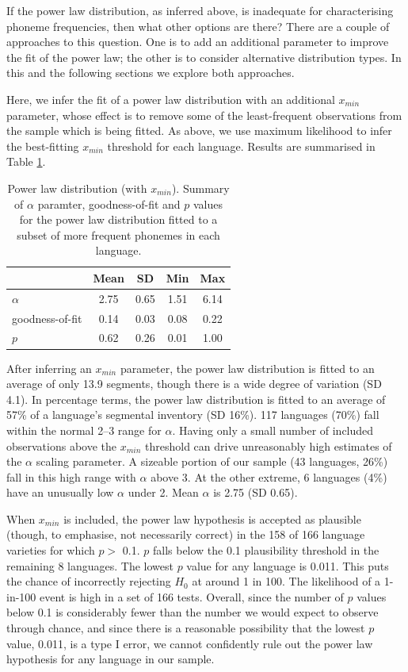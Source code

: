 If the power law distribution, as inferred above, is inadequate for characterising phoneme frequencies, then what other options are there? There are a couple of approaches to this question. One is to add an additional parameter to improve the fit of the power law; the other is to consider alternative distribution types. In this and the following sections we explore both approaches.

Here, we infer the fit of a power law distribution with an additional \(x_{min}\) parameter, whose effect is to remove some of the least-frequent observations from the sample which is being fitted. As above, we use maximum likelihood to infer the best-fitting \(x_{min}\) threshold for each language. Results are summarised in Table \ref{tab:pl-xmin-summary}.

\begin{table}

\caption{\label{tab:pl-xmin-summary}Power law distribution (with $x_{min}$). Summary of $\alpha$ paramter, goodness-of-fit and $p$ values for the power law distribution fitted to a subset of more frequent phonemes in each language.}
\centering
\begin{tabular}[t]{lcccc}
\toprule
\textbf{ } & \textbf{Mean} & \textbf{SD} & \textbf{Min} & \textbf{Max}\\
\midrule
$\alpha$ & 2.75 & 0.65 & 1.51 & 6.14\\
goodness-of-fit & 0.14 & 0.03 & 0.08 & 0.22\\
$p$ & 0.62 & 0.26 & 0.01 & 1.00\\
\bottomrule
\end{tabular}
\end{table}

After inferring an \(x_{min}\) parameter, the power law distribution is fitted to an average of only 13.9 segments, though there is a wide degree of variation (SD 4.1). In percentage terms, the power law distribution is fitted to an average of 57\% of a language's segmental inventory (SD 16\%). 117 languages (70\%) fall within the normal 2--3 range for \(\alpha\). Having only a small number of included observations above the \(x_{min}\) threshold can drive unreasonably high estimates of the \(\alpha\) scaling parameter. A sizeable portion of our sample (43 languages, 26\%) fall in this high range with \(\alpha\) above 3. At the other extreme, 6 languages (4\%) have an unusually low \(\alpha\) under 2. Mean \(\alpha\) is 2.75 (SD 0.65).

When \(x_{min}\) is included, the power law hypothesis is accepted as plausible (though, to emphasise, not necessarily correct) in the 158 of 166 language varieties for which \(p >\) 0.1. \(p\) falls below the 0.1 plausibility threshold in the remaining 8 languages. The lowest \(p\) value for any language is 0.011. This puts the chance of incorrectly rejecting \(H_0\) at around 1 in 100. The likelihood of a 1-in-100 event is high in a set of 166 tests. Overall, since the number of \(p\) values below 0.1 is considerably fewer than the number we would expect to observe through chance, and since there is a reasonable possibility that the lowest \(p\) value, 0.011, is a type I error, we cannot confidently rule out the power law hypothesis for any language in our sample.

